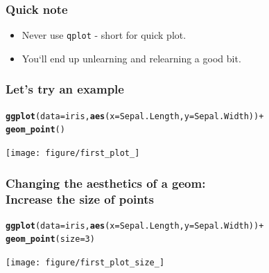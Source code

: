 \documentclass{beamer}\usepackage[]{graphicx}\usepackage[]{color}
\makeatletter
\newcommand{\hlkwd}[1]{\textcolor[rgb]{0.737,0.353,0.396}{\textbf{#1}}}%
\newenvironment{kframe}{%
 \def\at@end@of@kframe{}%
 \ifinner\ifhmode%
  \def\at@end@of@kframe{\end{minipage}}%
  \begin{minipage}{\columnwidth}%
 \fi\fi%
 \def\FrameCommand##1{\hskip\@totalleftmargin \hskip-\fboxsep
 \colorbox{shadecolor}{##1}\hskip-\fboxsep
     \hskip-\linewidth \hskip-\@totalleftmargin \hskip\columnwidth}%
 \MakeFramed {\advance\hsize-\width
   \@totalleftmargin\z@ \linewidth\hsize
   \@setminipage}}%
 {\par\unskip\endMakeFramed%
 \at@end@of@kframe}
\newenvironment{knitrout}{}{} %
\makeatother
\begin{document}

\begin{frame}[fragile]
\frametitle{Quick note}
\begin{itemize}
\item Never use \texttt{qplot} - short for quick plot.
\item You`ll end up unlearning and relearning a good bit.
\end{itemize}

\end{frame}


\begin{frame}[fragile]
\frametitle{Let's try an example}
\begin{knitrout}\footnotesize
{}\color{fgcolor}\begin{kframe}
\begin{alltt}
\hlkwd{ggplot}(data = iris, \hlkwd{aes}(x = Sepal.Length, y = Sepal.Width)) +
\hlkwd{geom_point}()
\end{alltt}
\end{kframe}

{\centering \texttt{[image: figure/first\_plot\_]} 

}



\end{knitrout}

\end{frame}


\begin{frame}[fragile]
\frametitle{Changing the aesthetics of a geom: \\Increase the size of points}
\begin{knitrout}\footnotesize
{}\color{fgcolor}\begin{kframe}
\begin{alltt}
\hlkwd{ggplot}(data = iris, \hlkwd{aes}(x = Sepal.Length, y = Sepal.Width)) +
\hlkwd{geom_point}(size = 3)
\end{alltt}
\end{kframe}

{\centering \texttt{[image: figure/first\_plot\_size\_]} 

}



\end{knitrout}

\end{frame}
\end{document}
